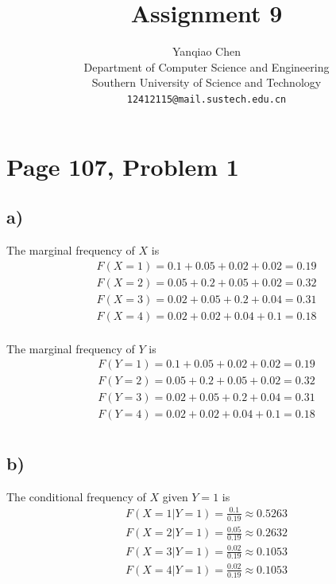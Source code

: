 \documentclass[a4paper, UTF-8]{article}
\theoremstyle{plain}
\begin{document}
\title{\textbf{Assignment 9}}

\author{Yanqiao Chen\\ 
  Department of Computer Science and Engineering\\
  Southern University of Science and Technology\\
  \texttt{12412115@mail.sustech.edu.cn}
  }


\maketitle

\section{Page 107, Problem 1}

\subsection{a)} 

The marginal frequency of $X$ is
\begin{align*} 
F(X = 1) = 0.1 + 0.05 + 0.02 + 0.02 = 0.19\\
F(X = 2) = 0.05 + 0.2 + 0.05 + 0.02 = 0.32\\
F(X = 3) = 0.02 + 0.05 + 0.2 + 0.04 = 0.31\\
F(X = 4) = 0.02 + 0.02 + 0.04 + 0.1 = 0.18\\
\end{align*}

The marginal frequency of $Y$ is
\begin{align*}
F(Y = 1) = 0.1 + 0.05 + 0.02 + 0.02 = 0.19\\
F(Y = 2) = 0.05 + 0.2 + 0.05 + 0.02 = 0.32\\
F(Y = 3) = 0.02 + 0.05 + 0.2 + 0.04 = 0.31\\
F(Y = 4) = 0.02 + 0.02 + 0.04 + 0.1 = 0.18\\
\end{align*}

\subsection{b)} 

The conditional frequency of $X$ given $Y = 1$ is
\begin{align*}
F(X = 1|Y = 1) = \frac{0.1}{0.19} \approx 0.5263\\
F(X = 2|Y = 1) = \frac{0.05}{0.19} \approx 0.2632\\
F(X = 3|Y = 1) = \frac{0.02}{0.19} \approx 0.1053\\
F(X = 4|Y = 1) = \frac{0.02}{0.19} \approx 0.1053\\
\end{align*}
\end{document}
